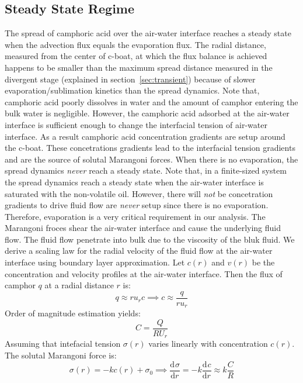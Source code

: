 \documentclass[aps, twocolumn, floatfix, superscriptaddress]{revtex4}
\newcommand{\tdc}[3][]{\frac{\mathrm{d}^{#1}#2}{\mathrm{d}#3^{#1}}} %
\begin{document}
\subsection{Steady State Regime}
\label{sec:steady}
The spread of camphoric acid over the air-water interface reaches a steady state when the advection flux equals the evaporation flux. The radial distance, measured from the center of c-boat, at which the flux balance is achieved happens to be smaller than the maximum spread distance measured in the divergent stage (explained in section~\ref{sec:transient}) because of slower evaporation/sublimation kinetics than the spread dynamics. Note that, camphoric acid poorly dissolves in water and the amount of camphor entering the bulk water is negligible. However, the camphoric acid adsorbed at the air-water interface is sufficient enough to change the interfacial tension of air-water interface. As a result camphoric acid concentration gradients are setup around the c-boat. These concetrations gradients lead to the interfacial tension gradients and are the source of solutal Marangoni forces. When there is no evaporation, the spread dynamics \emph{never} reach a steady state. Note that, in a finite-sized system the spread dynamics reach a steady state when the air-water interface is saturated with the non-volatile oil. However, there will \emph{not} be concetration gradients to drive fluid flow are \emph{never} setup since there is no evaporation. Therefore, evaporation is a very critical requirement in our analysis. The Marangoni froces shear the air-water interface and cause the underlying fluid flow. The fluid flow penetrate into bulk due to the viscosity of the bluk fluid. We derive a scaling law for the radial velocity of the fluid flow at the air-water interface using boundary layer approximation. Let $c(r)$ and $v(r)$ be the concentration and velocity profiles at the air-water interface. Then the flux of camphor $q$ at a radial distance $r$ is: 
\begin{equation}
q \approx r u_{r} c \implies c \approx \frac{q}{ru_{r}} 
\end{equation}
Order of magnitude estimation yields:
\begin{equation}
C = \frac{Q}{RU_{r}}
\end{equation}
Assuming that intefacial tension $\sigma (r)$ varies linearly with concentration $c(r)$. The solutal Marangoni force is:
\begin{equation}
\sigma (r) = -k c(r) + \sigma_{0} \implies \tdc{\sigma}{r} = -k\tdc{c}{r}  \approx k \frac{C}{R}
\end{equation}
\end{document}
